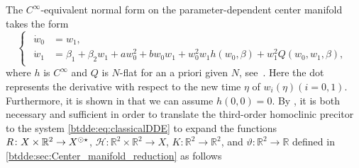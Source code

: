 The $C^\infty$-equivalent normal form on the parameter-dependent
center manifold takes the form
\begin{equation}
\label{btdde:eq:normal_form_orbital}
\begin{cases}
\begin{aligned}
	\dot w_0 & =  w_1, \\
	\dot w_1 & =  \beta_1 + \beta_2 w_1 + aw_0^2 + b w_0 w_1 + w_0^2 w_1
								h(w_0,\beta) + w_1^2 Q(w_0,w_1,\beta),
\end{aligned}
\end{cases}
\end{equation}
where $h$ is $C^\infty$ and $Q$ is $N$-flat for an a priori given $N$,
see~\cite{Broer1991}. Here the dot represents the derivative with respect to
the new time $\eta$ of $w_i(\eta)(i = 0,1)$.  Furthermore, it is shown in
\cite{Bosschaert@Interplay} that we can assume $h(0,0) = 0$. 
By \cite[Proposition 1]{Bosschaert@Interplay}, it is both necessary and sufficient
in order to translate the third-order homoclinic precitor to the system
\cref{btdde:eq:classicalDDE} to expand the functions $R \colon X \times \mathbb R^2 \rightarrow X^{\odot\star}$, 
$\mathcal{H} \colon \mathbb R^2 \times \mathbb R^2 \rightarrow X$,
$K \colon \mathbb R^2 \rightarrow \mathbb R^2$, and $\vartheta \colon \mathbb R^2 \rightarrow \mathbb R$ 
 defined in \cref{btdde:sec:Center_manifold_reduction}
as follows
%
